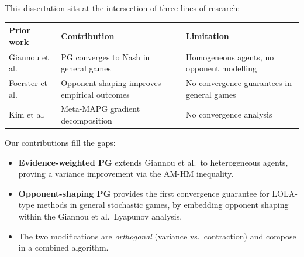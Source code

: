 This dissertation sits at the intersection of three lines of research:

\begin{center}
\renewcommand{\arraystretch}{1.3}
\begin{tabular}{lll}
\hline
\textbf{Prior work} & \textbf{Contribution} & \textbf{Limitation} \\
\hline
Giannou et al.~\cite{giannou2022} & PG converges to Nash in general games & Homogeneous agents, no opponent modelling \\
Foerster et al.~\cite{foerster2018lola} & Opponent shaping improves empirical outcomes & No convergence guarantees in general games \\
Kim et al.~\cite{kim2021policy} & Meta-MAPG gradient decomposition & No convergence analysis \\
\hline
\end{tabular}
\end{center}

Our contributions fill the gaps:
\begin{itemize}
    \item \textbf{Evidence-weighted PG} extends Giannou et al.\ to heterogeneous agents, proving a variance improvement via the AM-HM inequality.
    \item \textbf{Opponent-shaping PG} provides the first convergence guarantee for LOLA-type methods in general stochastic games, by embedding opponent shaping within the Giannou et al.\ Lyapunov analysis.
    \item The two modifications are \emph{orthogonal} (variance vs.\ contraction) and compose in a combined algorithm.
\end{itemize}
